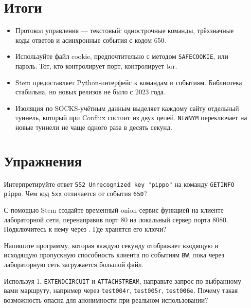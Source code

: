\section*{Итоги}
\begin{itemize}
  \item Протокол управления — текстовый: однострочные команды, трёхзначные коды ответов и асинхронные события с кодом 650.
  \item Используйте файл cookie, предпочтительно с методом \texttt{SAFECOOKIE}, или пароль. Тот, кто контролирует порт, контролирует tor.
  \item Stem предоставляет Python-интерфейс к командам и событиям. Библиотека стабильна, но новых релизов не было с 2023 года.
  \item Изоляция по SOCKS-учётным данным выделяет каждому сайту отдельный туннель, который при Conflux состоит из двух цепей. \texttt{NEWNYM} переключает на новые туннели не чаще одного раза в десять секунд.
\end{itemize}

\section*{Упражнения}

\begin{esercizio}[1]\label{es:18-codici}
Интерпретируйте ответ \texttt{552 Unrecognized key "pippo"} на команду \texttt{GETINFO pippo}. Чем код \texttt{5xx} отличается от события \texttt{650}?
\end{esercizio}

\begin{esercizio}[2]\label{es:18-onion}
С помощью Stem создайте временный onion-сервис функцией  на клиенте лабораторной сети, перенаправив порт 80 на локальный сервер порта 8080. Подключитесь к нему через . Где хранятся его ключи?
\end{esercizio}

\begin{esercizio}[2]\label{es:18-banda}
Напишите программу, которая каждую секунду отображает входящую и исходящую пропускную способность клиента по событиям \texttt{BW}, пока через лабораторную сеть загружается большой файл.
\end{esercizio}

\begin{esercizio}[3]\label{es:18-percorso}
Используя  1, \texttt{EXTENDCIRCUIT} и \texttt{ATTACHSTREAM}, направьте запрос по выбранному вами маршруту, например через \texttt{test004r}, \texttt{test005r}, \texttt{test006e}. Почему такая возможность опасна для анонимности при реальном использовании?
\end{esercizio}

